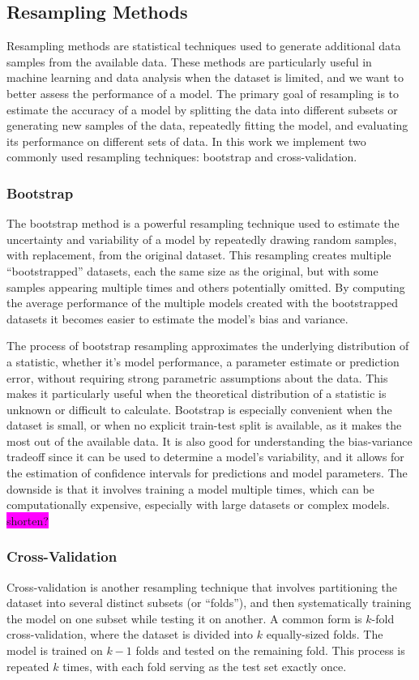 \documentclass[aps,pra,english,notitlepage,reprint,nofootinbib]{revtex4-1}  %
\begin{document}
\subsection{Resampling Methods}
Resampling methods are statistical techniques used to generate additional data samples from the available data. These methods are particularly useful in machine learning and data analysis when the dataset is limited, and we want to better assess the performance of a model. The primary goal of resampling is to estimate the accuracy of a model by splitting the data into different subsets or generating new samples of the data, repeatedly fitting the model, and evaluating its performance on different sets of data. In this work we implement two commonly used resampling techniques: bootstrap and cross-validation.

\subsubsection{Bootstrap}
The bootstrap method is a powerful resampling technique used to estimate the uncertainty and variability of a model by repeatedly drawing random samples, with replacement, from the original dataset. This resampling creates multiple ``bootstrapped'' datasets, each the same size as the original, but with some samples appearing multiple times and others potentially omitted. By computing the average performance of the multiple models created with the bootstrapped datasets it becomes easier to estimate the model's bias and variance.

The process of bootstrap resampling approximates the underlying distribution of a statistic, whether it's model performance, a parameter estimate or prediction error, without requiring strong parametric assumptions about the data. This makes it particularly useful when the theoretical distribution of a statistic is unknown or difficult to calculate. Bootstrap is especially convenient when the dataset is small, or when no explicit train-test split is available, as it makes the most out of the available data. It is also good for understanding the bias-variance tradeoff since it can be used to determine a model's variability, and it allows for the estimation of confidence intervals for predictions and model parameters. The downside is that it involves training a model multiple times, which can be computationally expensive, especially with large datasets or complex models. \colorbox{magenta}{shorten?}


\subsubsection{Cross-Validation}
Cross-validation is another resampling technique that involves partitioning the dataset into several distinct subsets (or ``folds''), and then systematically training the model on one subset while testing it on another. A common form is $k$-fold cross-validation, where the dataset is divided into $k$ equally-sized folds. The model is trained on $k-1$ folds and tested on the remaining fold. This process is repeated $k$ times, with each fold serving as the test set exactly once.
\end{document}
